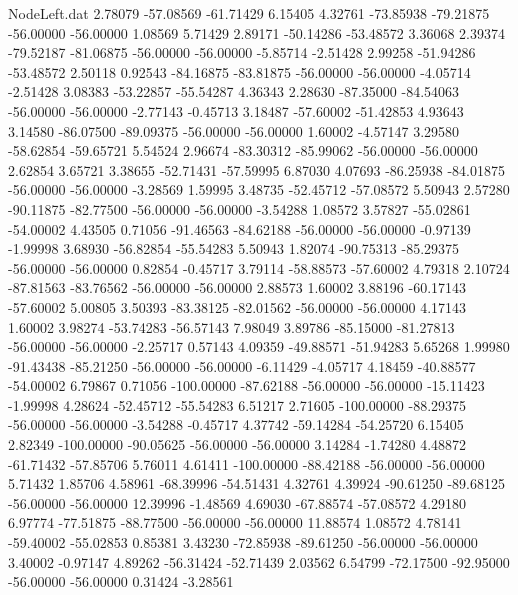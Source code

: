 \begin{filecontents}{NodeLeft.dat}
   2.78079  -57.08569  -61.71429     6.15405    4.32761  -73.85938  -79.21875  -56.00000  -56.00000    1.08569    5.71429
   2.89171  -50.14286  -53.48572     3.36068    2.39374  -79.52187  -81.06875  -56.00000  -56.00000   -5.85714   -2.51428
   2.99258  -51.94286  -53.48572     2.50118    0.92543  -84.16875  -83.81875  -56.00000  -56.00000   -4.05714   -2.51428
   3.08383  -53.22857  -55.54287     4.36343    2.28630  -87.35000  -84.54063  -56.00000  -56.00000   -2.77143   -0.45713
   3.18487  -57.60002  -51.42853     4.93643    3.14580  -86.07500  -89.09375  -56.00000  -56.00000    1.60002   -4.57147
   3.29580  -58.62854  -59.65721     5.54524    2.96674  -83.30312  -85.99062  -56.00000  -56.00000    2.62854    3.65721
   3.38655  -52.71431  -57.59995     6.87030    4.07693  -86.25938  -84.01875  -56.00000  -56.00000   -3.28569    1.59995
   3.48735  -52.45712  -57.08572     5.50943    2.57280  -90.11875  -82.77500  -56.00000  -56.00000   -3.54288    1.08572
   3.57827  -55.02861  -54.00002     4.43505    0.71056  -91.46563  -84.62188  -56.00000  -56.00000   -0.97139   -1.99998
   3.68930  -56.82854  -55.54283     5.50943    1.82074  -90.75313  -85.29375  -56.00000  -56.00000    0.82854   -0.45717
   3.79114  -58.88573  -57.60002     4.79318    2.10724  -87.81563  -83.76562  -56.00000  -56.00000    2.88573    1.60002
   3.88196  -60.17143  -57.60002     5.00805    3.50393  -83.38125  -82.01562  -56.00000  -56.00000    4.17143    1.60002
   3.98274  -53.74283  -56.57143     7.98049    3.89786  -85.15000  -81.27813  -56.00000  -56.00000   -2.25717    0.57143
   4.09359  -49.88571  -51.94283     5.65268    1.99980  -91.43438  -85.21250  -56.00000  -56.00000   -6.11429   -4.05717
   4.18459  -40.88577  -54.00002     6.79867    0.71056 -100.00000  -87.62188  -56.00000  -56.00000  -15.11423   -1.99998
   4.28624  -52.45712  -55.54283     6.51217    2.71605 -100.00000  -88.29375  -56.00000  -56.00000   -3.54288   -0.45717
   4.37742  -59.14284  -54.25720     6.15405    2.82349 -100.00000  -90.05625  -56.00000  -56.00000    3.14284   -1.74280
   4.48872  -61.71432  -57.85706     5.76011    4.61411 -100.00000  -88.42188  -56.00000  -56.00000    5.71432    1.85706
   4.58961  -68.39996  -54.51431     4.32761    4.39924  -90.61250  -89.68125  -56.00000  -56.00000   12.39996   -1.48569
   4.69030  -67.88574  -57.08572     4.29180    6.97774  -77.51875  -88.77500  -56.00000  -56.00000   11.88574    1.08572
   4.78141  -59.40002  -55.02853     0.85381    3.43230  -72.85938  -89.61250  -56.00000  -56.00000    3.40002   -0.97147
   4.89262  -56.31424  -52.71439     2.03562    6.54799  -72.17500  -92.95000  -56.00000  -56.00000    0.31424   -3.28561

\end{filecontents}
